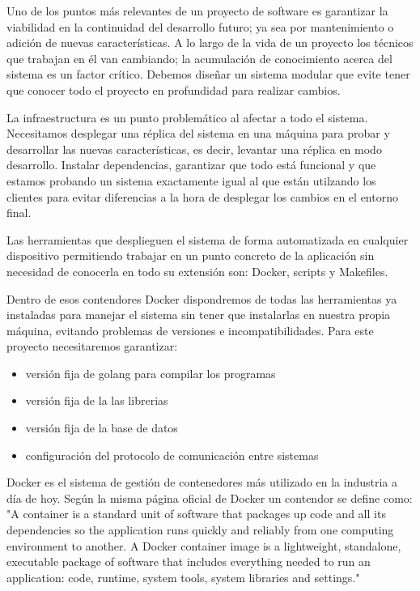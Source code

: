 
Uno de los puntos más relevantes de un proyecto de software es garantizar la viabilidad en la continuidad del desarrollo futuro; ya sea por mantenimiento o adición de nuevas características. A lo largo de la vida de un proyecto los técnicos que trabajan en él van cambiando; la acumulación de conocimiento acerca del sistema es un factor crítico. Debemos diseñar un sistema modular que evite tener que conocer todo el proyecto en profundidad para realizar cambios.

La infraestructura es un punto problemático al afectar a todo el sistema. Necesitamos desplegar una réplica del sistema en una máquina para probar y desarrollar las nuevas características, es decir, levantar una réplica en modo desarrollo. Instalar dependencias, garantizar que todo está funcional y que estamos probando un sistema exactamente igual al que están utilzando los clientes para evitar diferencias a la hora de desplegar los cambios en el entorno final.

Las herramientas que desplieguen el sistema de forma automatizada en cualquier dispositivo permitiendo trabajar en un punto concreto de la aplicación sin necesidad de conocerla en todo su extensión son: Docker, scripts y Makefiles.

Dentro de esos contendores Docker dispondremos de todas las herramientas ya instaladas para manejar el sistema sin tener que instalarlas en nuestra propia máquina, evitando problemas de versiones e incompatibilidades. Para este proyecto necesitaremos garantizar:

\begin{itemize}
    \item versión fija de golang para compilar los programas
    \item versión fija de la las librerias
    \item versión fija de la base de datos
    \item configuración del protocolo de comunicación entre sistemas
\end{itemize}

Docker es el sistema de gestión de contenedores más utilizado en la industria a día de hoy. Según la misma página oficial de Docker un contendor se define como: "A container is a standard unit of software that packages up code and all its dependencies so the application runs quickly and reliably from one computing environment to another. A Docker container image is a lightweight, standalone, executable package of software that includes everything needed to run an application: code, runtime, system tools, system libraries and settings."~\cite{docker}

